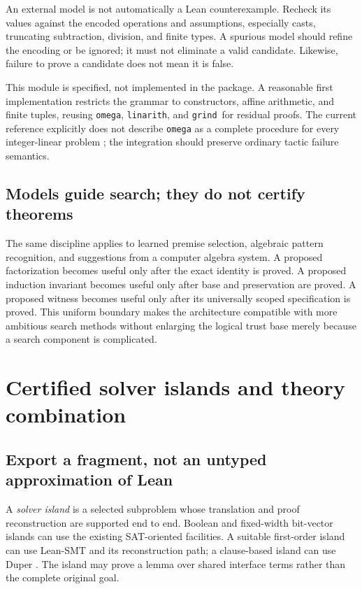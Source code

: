 \documentclass[11pt,a4paper]{article}
\newcommand{\grind}{\texttt{grind}}
\newcommand{\code}[1]{\texttt{\small #1}}
\begin{document}
An external model is not automatically a Lean counterexample. Recheck its
values against the encoded operations and assumptions, especially casts,
truncating subtraction, division, and finite types. A spurious model should
refine the encoding or be ignored; it must not eliminate a valid candidate.
Likewise, failure to prove a candidate does not mean it is false.

This module is specified, not implemented in the package. A reasonable first
implementation restricts the grammar to constructors, affine arithmetic, and
finite tuples, reusing \code{omega}, \code{linarith}, and \grind\ for residual
proofs. The current reference explicitly does not describe \code{omega} as a
complete procedure for every integer-linear problem \cite{lean-tactics}; the
integration should preserve ordinary tactic failure semantics.

\subsection{Models guide search; they do not certify theorems}

The same discipline applies to learned premise selection, algebraic pattern
recognition, and suggestions from a computer algebra system. A proposed
factorization becomes useful only after the exact identity is proved. A
proposed induction invariant becomes useful only after base and preservation
are proved. A proposed witness becomes useful only after its universally
scoped specification is proved. This uniform boundary makes the architecture
compatible with more ambitious search methods without enlarging the logical
trust base merely because a search component is complicated.


\section{Certified solver islands and theory combination}

\subsection{Export a fragment, not an untyped approximation of Lean}

A \emph{solver island} is a selected subproblem whose translation and proof
reconstruction are supported end to end. Boolean and fixed-width bit-vector
islands can use the existing SAT-oriented facilities. A suitable first-order
island can use Lean-SMT and its reconstruction path; a clause-based island can
use Duper \cite{lean-grind,lean-smt,duper}. The island may prove a lemma over
shared interface terms rather than the complete original goal.
\end{document}
